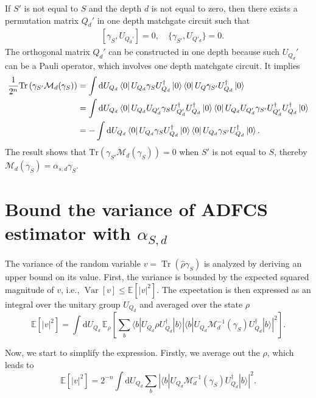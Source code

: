 \documentclass[showpacs,onecolumn,aps,prx,long bibliography,superscriptaddress,notitlepage]{revtex4-1}
\newcommand{\tra}[1]{\text{Tr}\left( #1 \right)}
\newcommand{\Var}{\mathop{\mathrm{Var}}}
\begin{document}
If $S'$ is not equal to $ S$ and the depth $d$ is not equal to zero, 
then there exists a permutation matrix $Q_d'$ in one depth matchgate circuit such that
\begin{align}
\quad [\gamma_{S}, U_{Q_d'}] = 0, \quad \{\gamma_{S'}, U_{Q'_d}\} = 0. 
\end{align}
The orthogonal matrix $Q_d'$ can be constructed in one depth because such $U_{Q_d}'$ can be a Pauli operator, which involves one depth matchgate circuit. It implies
\begin{align}
\frac{1}{2^n}\tra{\gamma_{S'} \mathcal{M}_d(\gamma_S)} &= 
\int \dd U_{Q_d} \bra{0} U_{Q_d} \gamma_S U_{Q_d}^\dagger \ket{0}\bra{0}U_Q \gamma_{S'} U_{Q_d}^\dagger\ket{0}\\
&=\int \dd U_{Q_d} \bra{0}U_{Q_d} U_{Q'_d} \gamma_S U_{Q'_d}^\dagger U_{Q_d}^\dagger\ket{0}\bra{0}U_{Q_d} U_{Q'_d}\gamma_{S'} U_{Q'_d}^\dagger U_{Q_d}^\dagger\ket{0}\\
&= -\int \dd U_{Q_d} \bra{0}U_{Q_d} \gamma_S U_{Q_d}^\dagger\ket{0}\bra{0}U_{Q_d} \gamma_{S'} U_{Q_d}^\dagger\ket{0}.
\end{align}
The result shows that $\tra{\gamma_{S'} \mathcal{M}_d(\gamma_S)} = 0$ when $S'$ is not equal to $ S$, thereby $\mathcal{M}_d (\gamma_S) = \alpha_{s,d} \gamma_S$.



\section{Bound the variance of ADFCS estimator with $\alpha_{S,d}$}
\label{appendix: bound variance}


The variance of the random variable $ v = \operatorname{Tr}(\hat{\rho} \gamma_S) $ is analyzed by deriving an upper bound on its value. First, the variance is bounded by the expected squared magnitude of $ v $, i.e., $ \Var[v] \leq \mathbb{E}[|v|^2] $. The expectation is then expressed as an integral over the unitary group $ U_{Q_d} $ and averaged over the state $ \rho $
\begin{equation}
    \mathbb{E}[|v|^2] = \int \mathrm{d}U_{Q_d} \, \mathbb{E}_{\rho}\left[\sum_b \langle b|U_{Q_d} \rho U_{Q_d}^\dagger|b \rangle \left|\langle b|U_{Q_d} \mathcal{M}_d^{-1}(\gamma_S) U_{Q_d}^\dagger|b \rangle\right|^2\right].
\end{equation}

Now, we start to simplify the expression.
Firstly, we average out the $\rho$, which leads to
\begin{equation}
    \mathbb{E}[|v|^2] = 2^{-n} \int \mathrm{d}U_{Q_d} \sum_b \left|\langle b|U_{Q_d} \mathcal{M}_d^{-1}(\gamma_S) U_{Q_d}^\dagger|b \rangle\right|^2.
\end{equation}
\end{document}
